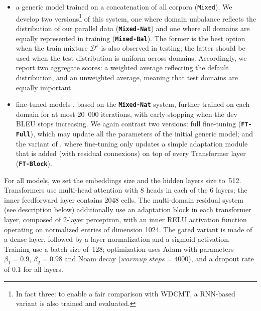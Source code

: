 \documentclass[11pt,a4paper]{article}
\newcommand{\fyDone}[1]{\done[FY]\Todo[FY:]{\textcolor{orange}{#1}}}
\newcommand{\jcDone}[1]{\done[JC]\Todo[JC:]{\textcolor{blue}{#1}}}
\newcommand{\system}[1]{\texttt{\textbf{#1}}}
\begin{document}
\begin{itemize}
\item a generic model trained on a concatenation of all corpora (\texttt{Mixed}). We develop two versions\footnote{In fact three: to enable a fair comparison with WDCMT, a RNN-based variant is also trained and evaluated.} of this system, one where domain unbalance reflects the distribution of our parallel data (\system{Mixed-Nat}) and one where all domains are equally represented in training (\system{Mixed-Bal}). The former is the best option when the train mixture $\mathcal{D}^s$ is also observed in testing; the latter should be used when the test distribution is uniform across domains. Accordingly, we report two aggregate scores: a weighted average reflecting the default distribution, and an unweighted average, meaning that test domains are equally important.
\item fine-tuned models \cite{Luong15stanford,Freitag16fast}\jcDone{i would use Luong and Manning 2015}, based on the \system{Mixed-Nat} system, further trained on each domain for at most 20~000 iterations, with early stopping when the dev BLEU stops increasing. We again contrast two versions: full fine-tuning (\system{FT-Full}), which may update all the parameters of the initial generic model; and the variant of \cite{Bapna19simple}, where fine-tuning only updates a simple adaptation module that is added (with residual connexions) on top of every Transformer layer (\system{FT-Block}).
\end{itemize}

For all models, we set the embeddings size and the hidden layers size to~512. Transformers use multi-head attention with 8 heads in each of the 6 layers; the inner feedforward layer contains 2048 cells. The multi-domain residual system (see description below) additionally use an adaptation block in each transformer layer, composed of 2-layer perceptron, with an inner RELU activation function operating on normalized entries of dimension 1024. The gated variant is made of a dense layer, followed by a layer normalization and a sigmoid activation.
Training use a batch size of~128; optimization uses Adam with parameters $\beta_1=0.9$, $\beta_2= 0.98$ and Noam decay ($warmup\_steps=4000$), and a dropout rate of $0.1$ for all layers.\fyDone{Describe the block adaptation layer - voir slides} 
\end{document}

